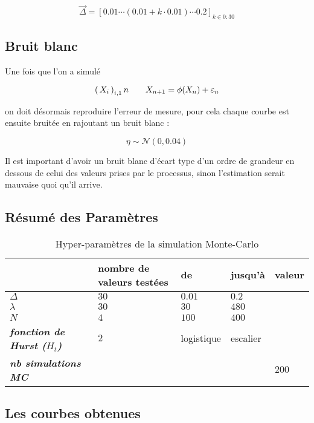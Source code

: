 $$
	\vec \Delta = [ 0.01 \cdots (0.01 + k\cdot0.01)\cdots 0.2 ]_{k \in 0:30}
$$

\subsection{Bruit blanc}


Une fois que l'on a simulé

$$
	\left( \, {X} _ {i} \, \right)_{i, 1} n \quad\quad X_{n+1} = \phi(X_n) + \varepsilon_n
$$

on doit désormais reproduire l'erreur de mesure, pour cela chaque courbe est ensuite bruitée en rajoutant un bruit blanc :

$$
	\eta \sim \mathcal N ( 0, 0.04 )
$$

Il est important d'avoir un bruit blanc d'écart type d'un ordre de grandeur en dessous de celui des valeurs prises par le processus, sinon l'estimation serait mauvaise quoi qu'il arrive.


\subsection{Résumé des Paramètres}

\begin{table}[H]
	\centering
	\begin{tabular}{l|l|ll|l|}
		\cline{2-5}
		\textbf{}                                                         & \textbf{nombre de valeurs testées} & \multicolumn{1}{l|}{\textbf{de}} & \textbf{jusqu'à}         & \textbf{valeur}          \\ \hline
		\multicolumn{1}{|l|}{\textit{\textbf{$\Delta$}}}                  & $30$                               & $0.01$                           & $0.2$                    & \cellcolor[HTML]{C0C0C0} \\
		\multicolumn{1}{|l|}{\textit{\textbf{$\lambda$}}}                 & $30$                               & $30$                             & $480$                    & \cellcolor[HTML]{C0C0C0} \\
		\multicolumn{1}{|l|}{\textit{\textbf{$N$}}}                       & $4$                                & $100$                            & $400$                    & \cellcolor[HTML]{C0C0C0} \\
		\multicolumn{1}{|l|}{\textit{\textbf{fonction de Hurst ($H_t$)}}} & $2$                                & logistique                       & escalier                 & \cellcolor[HTML]{C0C0C0} \\
		\multicolumn{1}{|l|}{\textit{\textbf{nb simulations MC}}}         & \cellcolor[HTML]{C0C0C0}           & \cellcolor[HTML]{C0C0C0}         & \cellcolor[HTML]{C0C0C0} & $200$                    \\ \hline
	\end{tabular}
	\caption{Hyper-paramètres de la simulation Monte-Carlo}
	\label{tab:hyperparam-mc}
\end{table}

\subsection{Les courbes obtenues}

